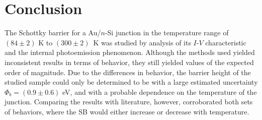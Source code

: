 \section{Conclusion}

The Schottky barrier for a Au/$n$-Si junction in the temperature range of $(84 \pm 2)$ K to \mbox{$(300 \pm 2)$ K} was studied by analysis of its $I$-$V$ characteristic and the internal photoemission phenomenon.
Although the methods used yielded inconsistent results in terms of behavior, they still yielded values of the expected order of magnitude.
Due to the differences in behavior, the barrier height of the studied sample could only be determined to be with a large estimated uncertainty $\Phi_b = (0.9 \pm 0.6)$ eV, and with a probable dependence on the temperature of the junction.
Comparing the results with literature, however,  corroborated both sets of behaviors, where the SB would either increase or decrease with temperature.

\newpage